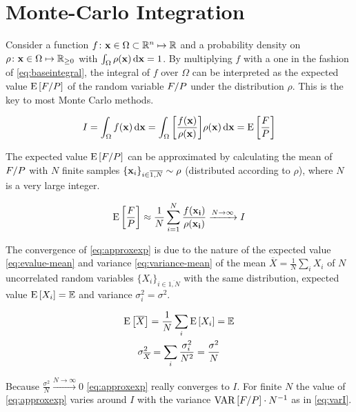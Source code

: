 \section{Monte-Carlo Integration}%
\label{sec:mcint}

Consider a function
\(f\colon \vb{x}\in\Omega\subset\mathbb{R}^n\mapsto\mathbb{R}\) and a
probability density on
\(\rho\colon \vb{x}\in\Omega\mapsto\mathbb{R}_{\geq 0}\) with
\(\int_{\Omega}\rho(\vb{x})\dd{\vb{x}} = 1\).  By multiplying \(f\)
with a one in the fashion of \cref{eq:baseintegral}, the integral
of \(f\) over \(\Omega\) can be interpreted as the expected value
\(\operatorname{E}\qty[F/P]\) of the random variable \(F/P\) under the
distribution \(\rho\). This is the key to most Monte Carlo methods.

\begin{equation}
  \label{eq:baseintegral}
  I = \int_\Omega f(\vb{x}) \dd{\vb{x}} = \int_\Omega
  \qty[\frac{f(\vb{x})}{\rho(\vb{x})}] \rho(\vb{x}) \dd{\vb{x}} = \operatorname{E}\qty[\frac{F}{P}]
\end{equation}

The expected value \(\operatorname{E}\qty[F/P]\) can be approximated by calculating
the mean of \(F/P\) with \(N\) finite samples
\(\{\vb{x}_i\}_{i\in\overline{1,N}}\sim\rho\) (distributed according
to \(\rho\)), where \(N\) is a very large integer.

\begin{equation}
  \label{eq:approxexp}
  \operatorname{E}\qty[\frac{F}{P}] \approx
  \frac{1}{N}\sum_{i=1}^N\frac{f(\vb{x_i})}{\rho(\vb{x_i})}
  \xrightarrow{N\rightarrow\infty} I
\end{equation}

The convergence of \cref{eq:approxexp} is due to the nature of the
expected value \cref{eq:evalue-mean} and
variance \cref{eq:variance-mean} of the mean
\(\overline{X} = \frac{1}{N}\sum_i X_i\) of \(N\) uncorrelated random
variables \(\{X_i\}_{i\in\overline{1,N}}\) with the same distribution,
expected value \(\operatorname{E}\qty[X_i]=\mathbb{E}\) and variance
\(\sigma_i^2 = \sigma^2\).

\begin{gather}
  \operatorname{E}\qty[\overline{X}] = \frac{1}{N}\sum_i\operatorname{E}\qty[X_i] = \mathbb{E} \label{eq:evalue-mean}\\
  \sigma^2_{\overline{X}} = \sum_i\frac{\sigma_i^2}{N^2} =
                            \frac{\sigma^2}{N}  \label{eq:variance-mean}
\end{gather}

Because \(\frac{\sigma^2}{N}\xrightarrow{N\rightarrow\infty} 0\)
\cref{eq:approxexp} really converges to \(I\). For finite \(N\) the
value of \cref{eq:approxexp} varies around \(I\) with the variance
\(\operatorname{VAR}\qty[F/P]\cdot N^{-1}\) as in \cref{eq:varI}.

